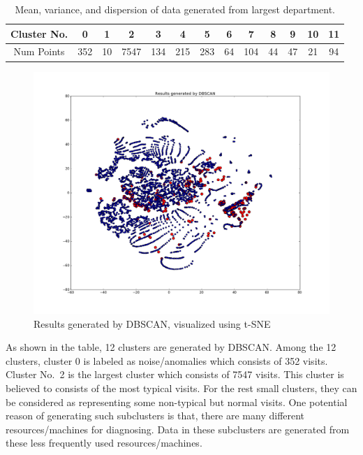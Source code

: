 \begin{table}[!ht]
	\begin{center}
		\begin{tabular}{|c|c|c|c|c|c|c|c|c|c|c|c|c|}
			\hline
			Cluster No. &    0 & 1  & 2    & 3   & 4   & 5   & 6  & 7   & 8  & 9  & 10 & 11	\\ \hline
			Num Points  &  352 & 10 & 7547 & 134 & 215 & 283 & 64 & 104 & 44 & 47 & 21 & 94 \\
			\hline

		\end{tabular}
	\end{center}
	\caption{Mean, variance, and dispersion of data generated from largest department.}
	\label{tab:ClusterResult}
\end{table}

\begin{figure}[!ht]
	\begin{center}
		\includegraphics[width=\textwidth]{images/ClusterResult2}
		\caption{Results generated by DBSCAN, visualized using t-SNE}
		\label{fig:ClusterResult}
	\end{center}
\end{figure}

As shown in the table, 12 clusters are generated by DBSCAN. Among the 12 clusters, cluster 0 is labeled as noise/anomalies which consists of 352 visits. Cluster No.~2 is the largest cluster which consists of 7547 visits. This cluster is believed to consists of the most typical visits. For the rest small clusters, they can be considered as representing some non-typical but normal visits. One potential reason of generating such subclusters is that, there are many different resources/machines for diagnosing. Data in these subclusters are generated from these less frequently used resources/machines.

